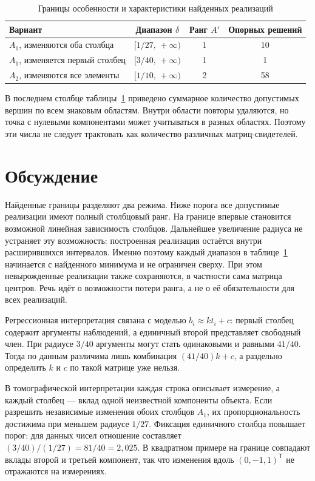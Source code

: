 \documentclass[12pt,a4paper]{article}
\begin{document}
\begin{table}[ht]
\centering
\caption{Границы особенности и характеристики найденных реализаций}
\label{tab:results}
\begin{tabular}{>{\raggedright\arraybackslash}p{49mm}ccc}
\toprule
Вариант & Диапазон $\delta$ & Ранг $A'$ & Опорных решений\\
\midrule
$A_1$, изменяются оба столбца
  & $[1/27,\,+\infty)$ & 1 & 10\\
$A_1$, изменяется первый столбец
  & $[3/40,\,+\infty)$ & 1 & 1\\
$A_2$, изменяются все элементы
  & $[1/10,\,+\infty)$ & 2 & 58\\
\bottomrule
\end{tabular}
\end{table}

В последнем столбце таблицы~\ref{tab:results} приведено суммарное
количество допустимых вершин по всем знаковым областям.
Внутри области повторы удаляются, но точка с нулевыми компонентами
может учитываться в разных областях. Поэтому эти числа не следует
трактовать как количество различных матриц-свидетелей.

\section{Обсуждение}

Найденные границы разделяют два режима. Ниже порога все допустимые
реализации имеют полный столбцовый ранг. На границе впервые
становится возможной линейная зависимость столбцов.
Дальнейшее увеличение радиуса не устраняет эту возможность:
построенная реализация остаётся внутри расширившихся интервалов.
Именно поэтому каждый диапазон в таблице~\ref{tab:results}
начинается с найденного минимума и не ограничен сверху.
При этом невырожденные реализации также сохраняются, в частности
сама матрица центров. Речь идёт о возможности потери ранга,
а не о её обязательности для всех реализаций.

Регрессионная интерпретация связана с моделью $b_i\approx k t_i+c$:
первый столбец содержит аргументы наблюдений, а единичный второй
представляет свободный член. При радиусе $3/40$ аргументы могут
стать одинаковыми и равными $41/40$. Тогда по данным различима
лишь комбинация $(41/40)k+c$, а раздельно определить $k$ и $c$
по такой матрице уже нельзя.

В томографической интерпретации каждая строка описывает измерение,
а каждый столбец --- вклад одной неизвестной компоненты объекта.
Если разрешить независимые изменения обоих столбцов $A_1$,
их пропорциональность достижима при меньшем радиусе $1/27$.
Фиксация единичного столбца повышает порог: для данных чисел
отношение составляет $(3/40)/(1/27)=81/40=2{,}025$.
В квадратном примере на границе совпадают вклады второй и третьей
компонент, так что изменения вдоль $(0,-1,1)^\mathsf T$
не отражаются на измерениях.
\end{document}
